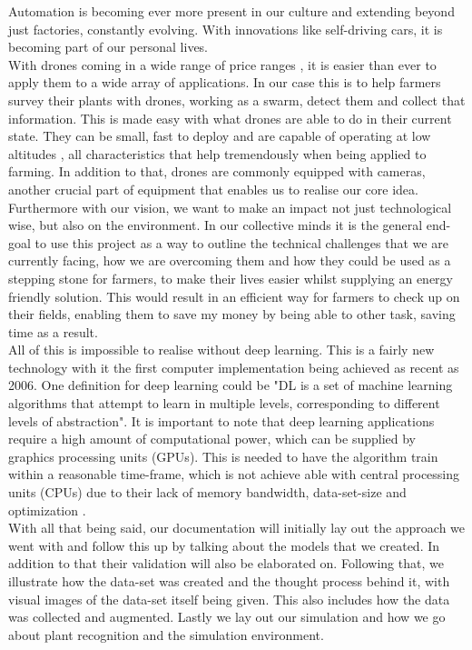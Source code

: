 \documentclass[english]{lni}
\begin{document}
Automation is becoming ever more present in our culture and extending beyond just factories, constantly evolving. With innovations like self-driving cars, it is becoming part of our personal lives.\\ 
With drones coming in a wide range of price ranges \cite{statistica}, it is easier than ever to apply them to a wide array of applications. In our case this is to help farmers survey their plants with drones, working as a swarm, detect them and collect that information.
This is made easy with what drones are able to do in their current state. They can be small, fast to deploy and are capable of operating at low altitudes \cite{efforg}, all characteristics that help tremendously when being applied to farming. In addition to that, drones are commonly equipped with cameras, another crucial part of equipment that enables us to realise our core idea.\\
Furthermore with our vision, we want to make an impact not just technological wise, but also on the environment. In our collective minds it is the general end-goal to use this project as a way to outline the technical challenges that we are currently facing, how we are overcoming them and how they could be used as a stepping stone for farmers, to make their lives easier whilst supplying an energy friendly solution. This would result in an efficient way for farmers to check up on their fields, enabling them to save my money by being able to other task, saving time as a result.\\
All of this is impossible to realise without deep learning. This is a fairly new technology with it the first computer implementation being achieved as recent as 2006. One definition for deep learning could be "DL is a set of machine learning algorithms that attempt to learn in multiple levels, corresponding to different levels of abstraction"\cite{info10040122}. It is important to note that deep learning applications require a high amount of computational power, which can be supplied by graphics processing units (GPUs). This is needed to have the algorithm train within a reasonable time-frame, which is not achieve able with central processing units (CPUs) due to their lack of memory bandwidth, data-set-size and optimization \cite{info10040122}\cite{runai}.\\
With all that being said, our documentation will initially lay out the approach we went with and follow this up by talking about the models that we created. In addition to that their validation will also be elaborated on. Following that, we illustrate how the data-set was created and the thought process behind it, with visual images of the data-set itself being given. This also includes how the data was collected and augmented. Lastly we lay out our simulation and how we go about plant recognition and the simulation environment.
\newpage
\end{document}
